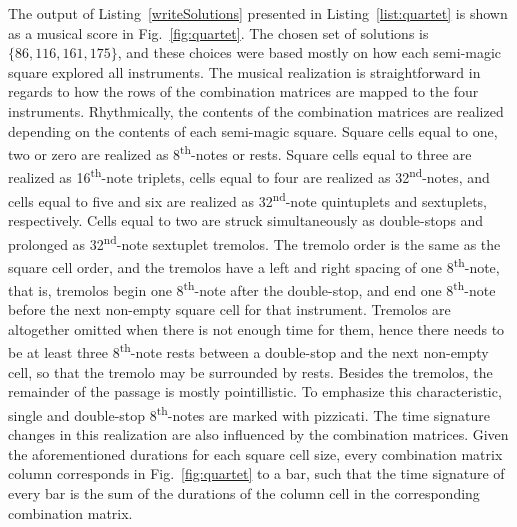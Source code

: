 The output of Listing~\ref{writeSolutions} presented in Listing~\ref{list:quartet} is shown as a musical score in Fig.~\ref{fig:quartet}. The chosen set of solutions is $\{86, 116, 161, 175\}$, and these choices were based mostly on how each semi-magic square explored all instruments. The musical realization is straightforward in regards to how the rows of the combination matrices are mapped to the four instruments. Rhythmically, the contents of the combination matrices are realized depending on the contents of each semi-magic square. Square cells equal to one, two or zero are realized as 8\textsuperscript{th}-notes or rests. Square cells equal to three are realized as 16\textsuperscript{th}-note triplets, cells equal to four are realized as 32\textsuperscript{nd}-notes, and cells equal to five and six are realized as 32\textsuperscript{nd}-note quintuplets and sextuplets, respectively. Cells equal to two are struck simultaneously as double-stops and prolonged as 32\textsuperscript{nd}-note sextuplet tremolos. The tremolo order is the same as the square cell order, and the tremolos have a left and right spacing of one 8\textsuperscript{th}-note, that is, tremolos begin one 8\textsuperscript{th}-note after the double-stop, and end one 8\textsuperscript{th}-note before the next non-empty square cell for that instrument. Tremolos are altogether omitted when there is not enough time for them, hence there needs to be at least three 8\textsuperscript{th}-note rests between a double-stop and the next non-empty cell, so that the tremolo may be surrounded by rests. Besides the tremolos, the remainder of the passage is mostly pointillistic. To emphasize this characteristic, single and double-stop 8\textsuperscript{th}-notes are marked with pizzicati. The time signature changes in this realization are also influenced by the combination matrices. Given the aforementioned durations for each square cell size, every combination matrix column corresponds in Fig.~\ref{fig:quartet} to a bar, such that the time signature of every bar is the sum of the durations of the column cell in the corresponding combination matrix.

